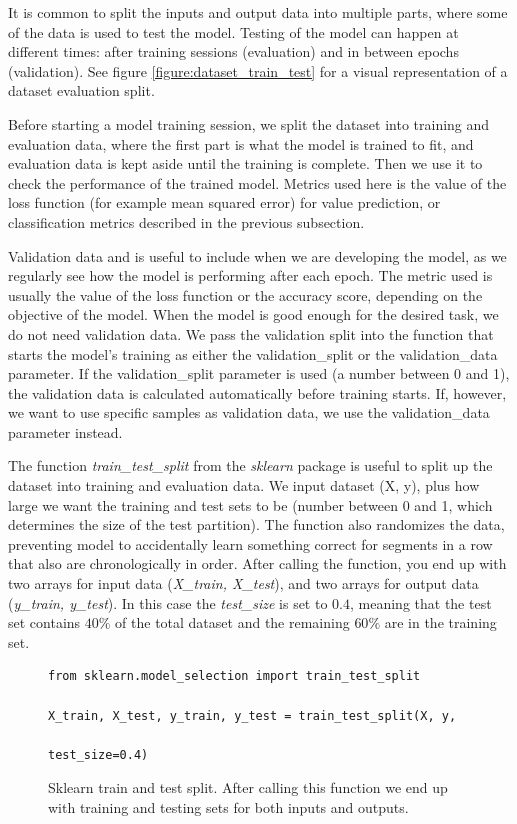 It is common to split the inputs and output data into multiple parts, where some of the data is used to test the model. Testing of the model can happen at different times: after training sessions (evaluation) and in between epochs (validation). See figure \ref{figure:dataset_train_test} for a visual representation of a dataset evaluation split.

Before starting a model training session, we split the dataset into training and evaluation data, where the first part is what the model is trained to fit, and evaluation data is kept aside until the training is complete. Then we use it to check the performance of the trained model. Metrics used here is the value of the loss function (for example mean squared error) for value prediction, or classification metrics described in the previous subsection.

Validation data and is useful to include when we are developing the model, as we regularly see how the model is performing after each epoch. The metric used is usually the value of the loss function or the accuracy score, depending on the objective of the model. When the model is good enough for the desired task, we do not need validation data. We pass the validation split into the function that starts the model's training as either the validation\_split or the validation\_data parameter. If the validation\_split parameter is used (a number between 0 and 1), the validation data is calculated automatically before training starts. If, however, we want to use specific samples as validation data, we use the validation\_data parameter instead.

The function \textit{train\_test\_split} from the \textit{sklearn} package is useful to split up the dataset into training and evaluation data. We input dataset (X, y), plus how large we want the training and test sets to be (number between 0 and 1, which determines the size of the test partition). The function also randomizes the data, preventing model to accidentally learn something correct for segments in a row that also are chronologically in order. After calling the function, you end up with two arrays for input data (\textit{X\_train, X\_test}), and two arrays for output data (\textit{y\_train, y\_test}). In this case the \textit{test\_size} is set to $0.4$, meaning that the test set contains $40\%$ of the total dataset and the remaining $60\%$ are in the training set.

\begin{figure}[h]
\begin{code}
    \begin{verbatim}
from sklearn.model_selection import train_test_split

X_train, X_test, y_train, y_test = train_test_split(X, y, 
                                                    test_size=0.4)
    \end{verbatim}
    \caption{Sklearn train and test split. After calling this function we end up with training and testing sets for both inputs and outputs.}
    \label{code:sklearn_train_test_split}
\end{code}
\end{figure}

